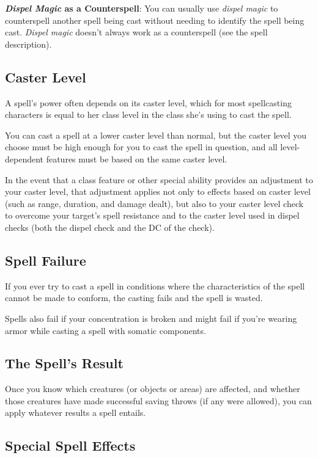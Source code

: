 \textbf{\textit{Dispel Magic } as a Counterspell}: You can usually use \textit{dispel magic }to counterspell another spell being cast without needing to identify the spell being cast. \textit{Dispel magic }doesn't always work as a counterspell (see the spell description).
				
\subsection{Caster Level}

				
A spell's power often depends on its caster level, which for most spellcasting characters is equal to her class level in the class she's using to cast the spell. 
				
You can cast a spell at a lower caster level than normal, but the caster level you choose must be high enough for you to cast the spell in question, and all level-dependent features must be based on the same caster level. 
				
In the event that a class feature or other special ability provides an adjustment to your caster level, that adjustment applies not only to effects based on caster level (such as range, duration, and damage dealt), but also to your caster level check to overcome your target's spell resistance and to the caster level used in dispel checks (both the dispel check and the DC of the check). 
				
\subsection{Spell Failure}

				
If you ever try to cast a spell in conditions where the characteristics of the spell cannot be made to conform, the casting fails and the spell is wasted.
				
Spells also fail if your concentration is broken and might fail if you're wearing armor while casting a spell with somatic components.
				
\subsection{The Spell's Result}

				
Once you know which creatures (or objects or areas) are affected, and whether those creatures have made successful saving throws (if any were allowed), you can apply whatever results a spell entails.
				
\subsection{Special Spell Effects}

